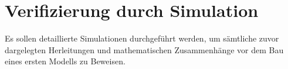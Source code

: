 \section{Verifizierung durch Simulation}
	Es sollen detaillierte Simulationen durchgeführt werden, um sämtliche zuvor dargelegten Herleitungen und mathematischen Zusammenhänge vor dem Bau eines ersten Modells zu Beweisen.